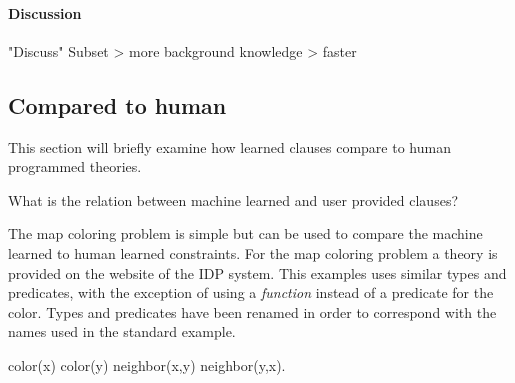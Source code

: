 \paragraph{Discussion}
"Discuss"
Subset > more background knowledge > faster

\subsection{Compared to human}

This section will briefly examine how learned clauses compare to human programmed theories.

\begin{question}
	What is the relation between machine learned and user provided clauses?
\end{question}

\begin{observation}
\label{exp:cd_user_show}
	The map coloring problem is simple but can be used to compare the machine learned to human learned constraints.
	For the map coloring problem a theory is provided on the website of the IDP system.
	This examples uses similar types and predicates, with the exception of using a \emph{function} instead of a predicate for the color.
	Types and predicates have been renamed in order to correspond with the names used in the standard example.  

	\begin{shiftedflalign*}
		color(x) \neq color(y) \leftarrow neighbor(x,y) \lor neighbor(y,x).
	\end{shiftedflalign*}

\end{observation}

